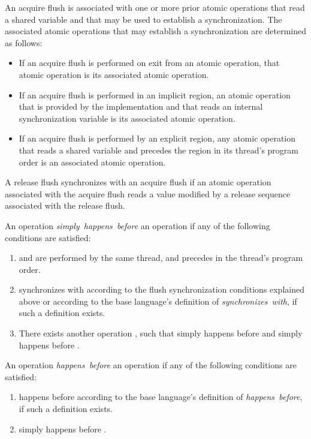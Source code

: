 An acquire flush is associated with one or more prior atomic operations that
read a shared variable and that may be used to establish a synchronization.
The associated atomic operations that may establish a synchronization are
determined as follows:

\begin{itemize}
\item If an acquire flush is performed on exit from an atomic operation, that
    atomic operation is its associated atomic operation.
\item If an acquire flush is performed in an implicit  region, an  
    atomic operation that is provided by the implementation and that reads an 
    internal synchronization variable is its associated atomic operation.
\item If an acquire flush is performed by an explicit  region, any
    atomic operation that reads a shared variable and precedes the
     region in its thread's program order is an associated atomic
    operation.
\end{itemize}

A release flush synchronizes with an acquire flush if an atomic operation
associated with the acquire flush reads a value modified by
a release sequence associated with the release flush.

An operation  \emph{simply~happens~before} an operation  if any of the following conditions are satisfied:
\begin{enumerate}
\item {} and  are performed by the same thread, and  precedes  in the thread's program order.
\item {} synchronizes with  according to the flush synchronization conditions explained above or according
    to the base language's definition of \emph{synchronizes~with}, if such a definition exists.
\item There exists another operation , such that  simply happens before  and  simply happens before .
\end{enumerate}

An operation  \emph{happens~before} an operation  if any of the following conditions are satisfied:
\begin{enumerate}
\item {} happens before  according to the base language's definition of \emph{happens~before}, if such a definition exists.
\item {} simply happens before .
\end{enumerate}

